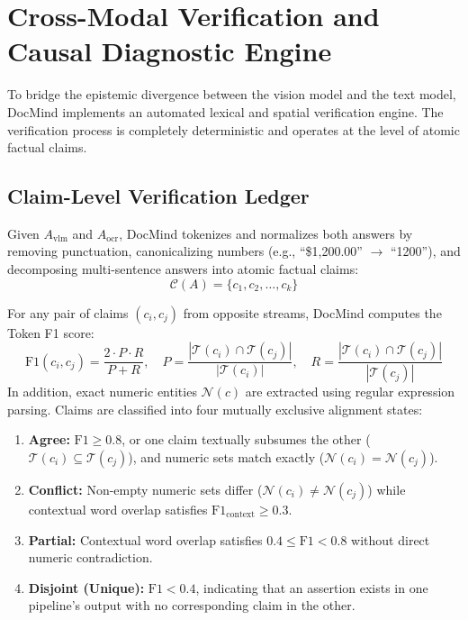 \documentclass[conference]{IEEEtran}
\begin{document}
\section{Cross-Modal Verification and Causal Diagnostic Engine}

To bridge the epistemic divergence between the vision model and the text model, DocMind implements an automated lexical and spatial verification engine. The verification process is completely deterministic and operates at the level of atomic factual claims.

\subsection{Claim-Level Verification Ledger}
Given $A_{\text{vlm}}$ and $A_{\text{ocr}}$, DocMind tokenizes and normalizes both answers by removing punctuation, canonicalizing numbers (e.g., ``\$1,200.00'' $\to$ ``1200''), and decomposing multi-sentence answers into atomic factual claims:
\begin{equation}
    \mathcal{C}(A) = \{c_1, c_2, \dots, c_k\}
    \label{eq:claims}
\end{equation}

For any pair of claims $(c_i, c_j)$ from opposite streams, DocMind computes the Token F1 score:
\begin{equation}
    \text{F1}(c_i, c_j) = \frac{2 \cdot P \cdot R}{P + R}, \quad P = \frac{|\mathcal{T}(c_i) \cap \mathcal{T}(c_j)|}{|\mathcal{T}(c_i)|}, \quad R = \frac{|\mathcal{T}(c_i) \cap \mathcal{T}(c_j)|}{|\mathcal{T}(c_j)|}
    \label{eq:token_f1}
\end{equation}
In addition, exact numeric entities $\mathcal{N}(c)$ are extracted using regular expression parsing. Claims are classified into four mutually exclusive alignment states:
\begin{enumerate}
    \item \textbf{Agree:} $\text{F1} \ge 0.8$, or one claim textually subsumes the other ($\mathcal{T}(c_i) \subseteq \mathcal{T}(c_j)$), and numeric sets match exactly ($\mathcal{N}(c_i) = \mathcal{N}(c_j)$).
    \item \textbf{Conflict:} Non-empty numeric sets differ ($\mathcal{N}(c_i) \neq \mathcal{N}(c_j)$) while contextual word overlap satisfies $\text{F1}_{\text{context}} \ge 0.3$.
    \item \textbf{Partial:} Contextual word overlap satisfies $0.4 \le \text{F1} < 0.8$ without direct numeric contradiction.
    \item \textbf{Disjoint (Unique):} $\text{F1} < 0.4$, indicating that an assertion exists in one pipeline's output with no corresponding claim in the other.
\end{enumerate}
\end{document}
